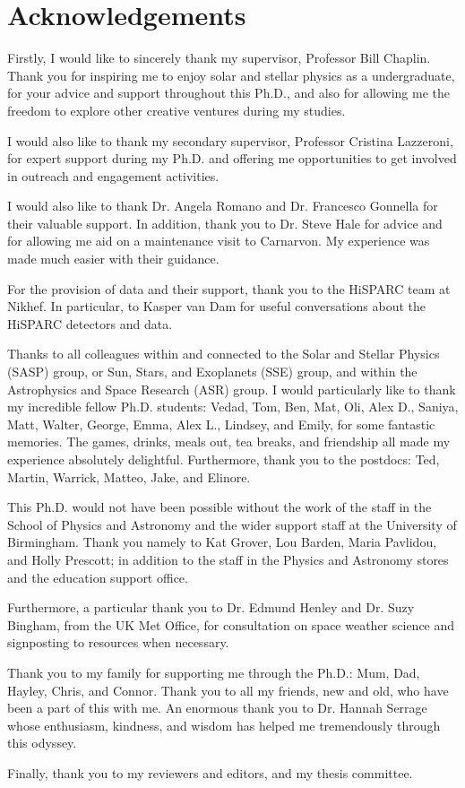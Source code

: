 \chapter*{Acknowledgements}
\thispagestyle{plain}

Firstly, I would like to sincerely thank my supervisor, Professor Bill Chaplin. Thank you for inspiring me to enjoy solar and stellar physics as a undergraduate, for your advice and support throughout this Ph.D., and also for allowing me the freedom to explore other creative ventures during my studies.

I would also like to thank my secondary supervisor, Professor Cristina Lazzeroni, for expert support during my Ph.D. and offering me opportunities to get involved in outreach and engagement activities.

I would also like to thank Dr. Angela Romano and Dr. Francesco Gonnella for their valuable support. In addition, thank you to Dr. Steve Hale for advice and for allowing me aid on a maintenance visit to Carnarvon. My experience was made much easier with their guidance.

For the provision of data and their support, thank you to the HiSPARC team at Nikhef. In particular, to Kasper van Dam for useful conversations about the HiSPARC detectors and data.

Thanks to all colleagues within and connected to the Solar and Stellar Physics (SASP) group, or Sun, Stars, and Exoplanets (SSE) group, and within the Astrophysics and Space Research (ASR) group. I would particularly like to thank my incredible fellow Ph.D. students: Vedad, Tom, Ben, Mat, Oli, Alex D., Saniya, Matt, Walter, George, Emma, Alex L., Lindsey, and Emily, for some fantastic memories. The games, drinks, meals out, tea breaks, and friendship all made my experience absolutely delightful. Furthermore, thank you to the postdocs: Ted, Martin, Warrick, Matteo, Jake, and Elinore.

This Ph.D. would not have been possible without the work of the staff in the School of Physics and Astronomy and the wider support staff at the University of Birmingham. Thank you namely to Kat Grover, Lou Barden, Maria Pavlidou, and Holly Prescott; in addition to the staff in the Physics and Astronomy stores and the education support office.

Furthermore, a particular thank you to Dr. Edmund Henley and Dr. Suzy Bingham, from the UK Met Office, for consultation on space weather science and signposting to resources when necessary.

Thank you to my family for supporting me through the Ph.D.: Mum, Dad, Hayley, Chris, and Connor. Thank you to all my friends, new and old, who have been a part of this with me. An enormous thank you to Dr. Hannah Serrage whose enthusiasm, kindness, and wisdom has helped me tremendously through this odyssey.

Finally, thank you to my reviewers and editors, and my thesis committee.